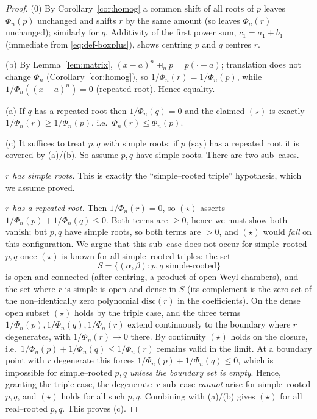 \documentclass[12pt]{article}
\theoremstyle{definition}
\newcommand{\boxp}{\boxplus_n}
\begin{document}
\begin{proof}
(0) By Corollary~\ref{cor:homog} a common shift of all roots of $p$ leaves $\Phi_n(p)$
unchanged and shifts $r$ by the same amount (so leaves $\Phi_n(r)$ unchanged); similarly for
$q$. Additivity of the first power sum, $c_1=a_1+b_1$ (immediate from
\eqref{eq:def-boxplus}), shows centring $p$ and $q$ centres $r$.

(b) By Lemma~\ref{lem:matrix}, $(x-a)^n\boxp p=p(\cdot-a)$; translation does not change
$\Phi_n$ (Corollary~\ref{cor:homog}), so $1/\Phi_n(r)=1/\Phi_n(p)$, while
$1/\Phi_n((x-a)^n)=0$ (repeated root). Hence equality.

(a) If $q$ has a repeated root then $1/\Phi_n(q)=0$ and the claimed $(\star)$ is exactly
$1/\Phi_n(r)\ge1/\Phi_n(p)$, i.e.\ $\Phi_n(r)\le\Phi_n(p)$.

(c) It suffices to treat $p,q$ with simple roots: if $p$ (say) has a repeated root it is
covered by (a)/(b). So assume $p,q$ have simple roots. There are two sub--cases.

\emph{$r$ has simple roots.} This is exactly the ``simple--rooted triple'' hypothesis, which
we assume proved.

\emph{$r$ has a repeated root.} Then $1/\Phi_n(r)=0$, so $(\star)$ asserts
$1/\Phi_n(p)+1/\Phi_n(q)\le0$. Both terms are $\ge0$, hence we must show both vanish; but
$p,q$ have simple roots, so both terms are $>0$, and $(\star)$ would \emph{fail} on this
configuration. We argue that this sub--case does not occur for simple--rooted $p,q$ once
$(\star)$ is known for all simple--rooted triples: the set
\[
S=\{(\alpha,\beta): p,q\text{ simple-rooted}\}
\]
is open and connected (after centring, a product of open Weyl chambers), and the set where
$r$ is simple is open and dense in $S$ (its complement is the zero set of the non--identically
zero polynomial $\mathrm{disc}(r)$ in the coefficients). On the dense open subset $(\star)$
holds by the triple case, and the three terms $1/\Phi_n(p),1/\Phi_n(q),1/\Phi_n(r)$ extend
continuously to the boundary where $r$ degenerates, with $1/\Phi_n(r)\to0$ there. By
continuity $(\star)$ holds on the closure, i.e.\ $1/\Phi_n(p)+1/\Phi_n(q)\le1/\Phi_n(r)$
remains valid in the limit. At a boundary point with $r$ degenerate this forces
$1/\Phi_n(p)+1/\Phi_n(q)\le0$, which is impossible for simple--rooted $p,q$ \emph{unless the
boundary set is empty}. Hence, granting the triple case, the degenerate--$r$ sub--case
\emph{cannot} arise for simple--rooted $p,q$, and $(\star)$ holds for all such $p,q$.
Combining with (a)/(b) gives $(\star)$ for all real--rooted $p,q$. This proves (c).
\end{proof}
\end{document}
